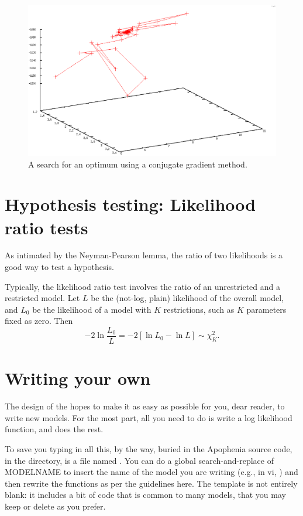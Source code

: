 \begin{figure}
\includegraphics[width=\textwidth*\real{1.1}]{search}
\caption{A search for an optimum using a conjugate gradient method.}
\end{figure}

\section{Hypothesis testing: Likelihood ratio tests} 
As intimated by the Neyman-Pear\-son lemma, the ratio of two
likelihoods is a good way to test a hypothesis. 

Typically, the likelihood ratio test involves the ratio of an
unrestricted and a restricted model. Let $L$ be the (not-log, plain)
likelihood of the overall model, and $L_0$ be the likelihood of a
model with $K$ restrictions, such as $K$ parameters fixed as zero. Then
$$-2\ln\frac{L_0}{L} = -2[\ln L_0 - \ln L] \sim \chi^2_K.$$


\section{Writing your own} \label{writeyourown}
The design of the  hopes to make it as easy as
possible for you, dear reader, to write new models. For the most
part, all you need to do is write a log likelihood function, and
 does the rest.  

To save you typing in all this, by the way, buried in the Apophenia
source code, in the  directory, is a file named
.  
You can do a global search-and-replace of MODELNAME to insert the name
of the model you are writing (e.g., in vi, )
and then rewrite the functions as per the guidelines here. The template
is not entirely blank: it includes a bit of code that is common to many
models, that you may keep or delete as you prefer.


